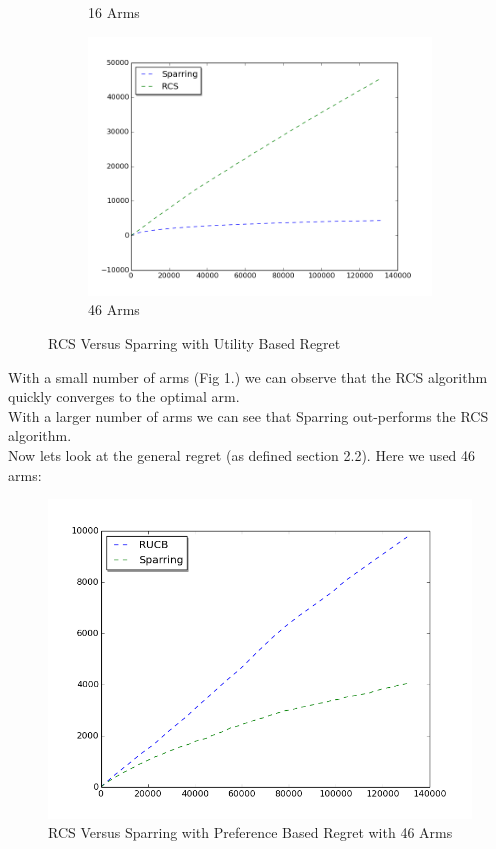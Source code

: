 \documentclass{llncs}
\begin{document}
\begin{figure}[h!]
\begin{subfigure}{.5\textwidth}
  \caption{16 Arms}
  \label{fig:sub2}
\end{subfigure}
\begin{subfigure}{.5\textwidth}
  \centering
  \includegraphics[scale=0.3]{figures/rcs_sparring_MQ2007_46arms.png}
  \caption{46 Arms}
  \label{fig:sub2}
\end{subfigure}
\caption{RCS Versus Sparring with Utility Based Regret}
\label{fig:test}
\end{figure}


With a small number of arms (Fig 1.) we can observe that the RCS algorithm quickly converges to the optimal arm.
\\
With a larger number of arms we can see that Sparring out-performs the RCS algorithm. 
\\
Now lets look at the general regret (as defined section 2.2). Here we used 46 arms:
\begin{figure}[h!]
  \centering
     \includegraphics[scale=0.4]{figures/rcs_sparring_MQ2007_general.png} 
  \caption{RCS Versus Sparring with Preference Based Regret with 46 Arms}
\end{figure}
\end{document}
